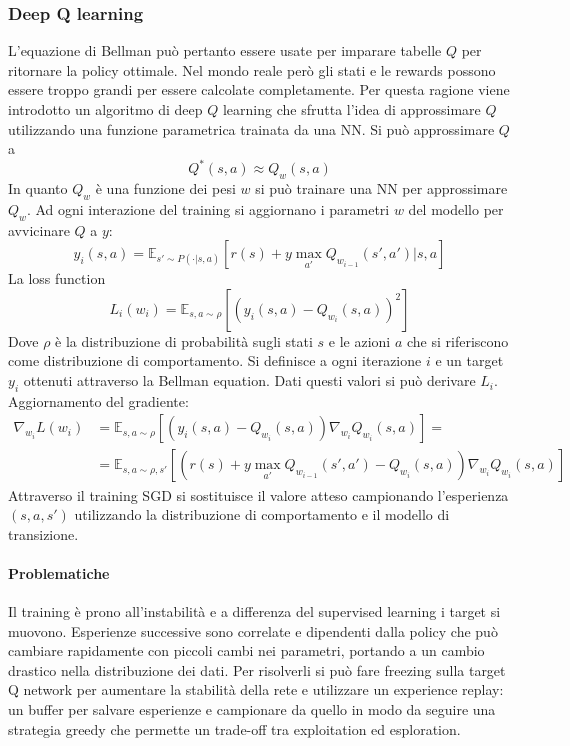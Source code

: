 		\subsubsection{Deep Q learning}
		L'equazione di Bellman pu\`o pertanto essere usate per imparare tabelle $Q$ per ritornare la policy ottimale.
		Nel mondo reale per\`o gli stati e le rewards possono essere troppo grandi per essere calcolate completamente.
		Per questa ragione viene introdotto un algoritmo di deep $Q$ learning che sfrutta l'idea di approssimare $Q$ utilizzando una funzione parametrica trainata da una NN.
		Si pu\`o approssimare $Q$ a
		$$Q^*(s,a) \approx Q_w(s,a)$$
		In quanto $Q_w$ \`e una funzione dei pesi $w$ si pu\`o trainare una NN per approssimare $Q_w$.
		Ad ogni interazione del training si aggiornano i parametri $w$ del modello per avvicinare $Q$ a $y$:
		$$y_i(s,a) = \mathbb{E}_{s'\sim P(\cdot|s,a)}[r(s)+y\max_{a'}Q_{w_{i-1}}(s',a')|s,a]$$
		La loss function
		$$L_i(w_i) = \mathbb{E}_{s,a\sim \rho}[(y_i(s,a) - Q_{w_i}(s,a))^2]$$
		Dove $\rho$ \`e la distribuzione di probabilit\`a sugli stati $s$ e le azioni $a$ che si riferiscono come distribuzione di comportamento.
		Si definisce a ogni iterazione $i$ e un target $y_i$ ottenuti attraverso la Bellman equation.
		Dati questi valori si pu\`o derivare $L_i$.
		Aggiornamento del gradiente:
		\begin{align*}
			\nabla_{w_i}L(w_i) &= \mathbb{E}_{s,a\sim\rho}[(y_i(s,a) - Q_{w_i}(s,a))\nabla_{w_i}Q_{w_i}(s,a)]=\\
			&= \mathbb{E}_{s,a\sim\rho,s'}[(r(s) + y\max_{a'}Q_{w_{i-1}}(s',a')-Q_{w_i}(s,a))\nabla_{w_i}Q_{w_i}(s,a)]
		\end{align*}
		Attraverso il training SGD si sostituisce il valore atteso campionando l'esperienza $(s,a,s')$ utilizzando la distribuzione di comportamento e il modello di transizione.
		
		\paragraph{Problematiche}
		Il training \`e prono all'instabilit\`a e a differenza del supervised learning i target si muovono.
		Esperienze successive sono correlate e dipendenti dalla policy che pu\`o cambiare rapidamente con piccoli cambi nei parametri, portando a un cambio drastico nella distribuzione dei dati.
		Per risolverli si pu\`o fare freezing sulla target Q network per aumentare la stabilit\`a della rete e utilizzare un experience replay: un buffer per salvare esperienze e campionare da quello in modo da seguire una strategia greedy che permette un trade-off tra exploitation ed esploration.


